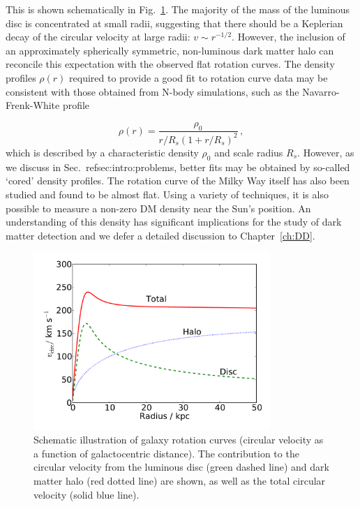 This is shown schematically in Fig.~\ref{fig:intro:RotationCurves}. The majority of the mass of the luminous disc is concentrated at small radii, suggesting that there should be a Keplerian decay of the circular velocity at large radii: $v \sim r^{-1/2}$. However, the inclusion of an approximately spherically symmetric, non-luminous dark matter halo can reconcile this expectation with the observed flat rotation curves. The density profiles $\rho(r)$ required to provide a good fit to rotation curve data may be consistent with those obtained from N-body simulations, such as the Navarro-Frenk-White profile

\begin{equation}
\label{eq:intro:NFW}
\rho(r) = \frac{\rho_0}{r/R_s(1 + r/R_s)^2}\,,
\end{equation}
which is described by a characteristic density $\rho_0$ and scale radius $R_s$. However, as we discuss in Sec.~ref{sec:intro:problems}, better fits may be obtained by so-called `cored' density profiles. The rotation curve of the Milky Way itself has also been studied \cite{Deason:2012,Lopez-Corredoira:2014,Bhattacharjee:2014} and found to be almost flat. Using a variety of techniques, it is also possible to measure a non-zero DM density near the Sun's position. An understanding of this density has significant implications for the study of dark matter detection and we defer a detailed discussion to Chapter~\ref{ch:DD}.

\begin{figure}[h]

  \centering
  \includegraphics[width=0.8\textwidth]{RotationCurve.pdf}
  \caption[Schematic illustration of galaxy rotation curves]{Schematic illustration of galaxy rotation curves (circular velocity as a function of galactocentric distance). The contribution to the circular velocity from the luminous disc (green dashed line) and dark matter halo (red dotted line) are shown, as well as the total circular velocity (solid blue line). }
  \label{fig:intro:RotationCurves}
\end{figure}

